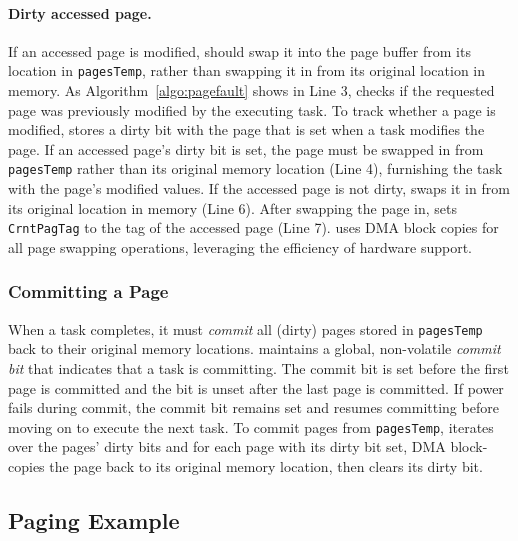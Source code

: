 \paragraph{Dirty accessed page.} If an accessed page is modified, \sys should swap it into the page buffer from its location in {\tt pagesTemp}, rather than swapping it in from its original location in memory. As Algorithm~\ref{algo:pagefault} shows in Line 3, \sys checks if the requested page was previously modified by the executing task. To track whether a page is modified, \sys stores a dirty bit with the page that is set when a task
modifies the page. If an accessed page's dirty bit is set, the page must be swapped in from \texttt{pagesTemp} rather than its original memory location (Line 4), furnishing the task with the page's modified values. If the accessed page is not dirty, \sys swaps it in from its original location in memory (Line 6). After swapping the page in, \sys sets \texttt{CrntPagTag} to the tag of the accessed page (Line 7). \sys uses DMA block copies for all page swapping operations, leveraging the efficiency of hardware support.

\subsubsection{Committing a Page}

When a task completes, it must {\em commit} all (dirty) pages stored in \texttt{pagesTemp} back to their original memory locations. \sys maintains a global, non-volatile {\em commit bit} that indicates that a task is committing. The commit bit is set before the first page is committed and the bit is unset after the last page is committed. If power fails during commit, the commit bit remains set and \sys resumes committing before moving on to execute the next task. To commit pages from {\tt pagesTemp}, \sys iterates over the pages' dirty bits and for each page with its dirty bit set, \sys DMA block-copies the page back to its
original memory location, then clears its dirty bit.

\subsection{Paging Example}


